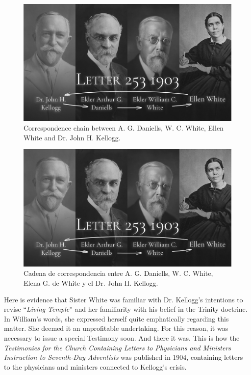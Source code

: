 \begin{figure}[h]
    \centering
    \includegraphics[width=1\linewidth]{images/correspondance.jpg}
    \caption*{Correspondence chain between A. G. Daniells, W. C. White, Ellen White and Dr. John H. Kellogg.}
    \label{fig:corespondance}
\end{figure}


\begin{figure}[h]
    \centering
    \includegraphics[width=1\linewidth]{images/correspondance.jpg}
    \caption*{Cadena de correspondencia entre A. G. Daniells, W. C. White, Elena G. de White y el Dr. John H. Kellogg.}
    \label{fig:corespondance}
\end{figure}


Here is evidence that Sister White was familiar with Dr. Kellogg's intentions to revise “\textit{Living Temple}” and her familiarity with his belief in the Trinity doctrine. In William's words, she expressed herself quite emphatically regarding this matter. She deemed it an unprofitable undertaking. For this reason, it was necessary to issue a special Testimony soon. And there it was. This is how the \textit{Testimonies for the Church Containing Letters to Physicians and Ministers Instruction to Seventh-Day Adventists} was published in 1904, containing letters to the physicians and ministers connected to Kellogg's crisis.



